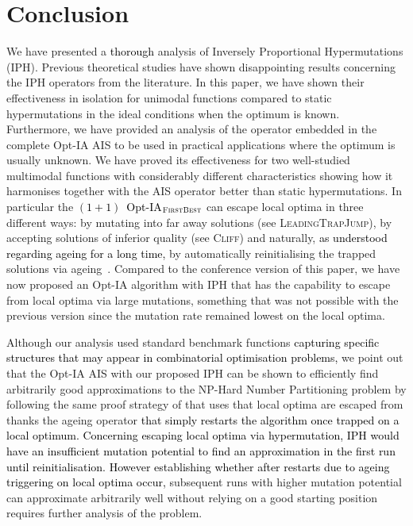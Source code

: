 \documentclass[lettersize,journal]{IEEEtran}
\newcommand{\rev}[1]{\textcolor{black}{#1}}
\newcommand{\rerev}[1]{\textcolor{black}{#1}}
\begin{document}
\section{Conclusion}
We have presented a \rerev{thorough} analysis of Inversely Proportional Hypermutations (IPH).
Previous theoretical studies have shown disappointing results concerning the IPH operators from the literature.
In this paper, we have 
shown their effectiveness in isolation for unimodal functions compared to static hypermutations in the ideal conditions when the optimum is known.
Furthermore, we have provided an analysis of the operator embedded in the complete Opt-IA AIS to be used in practical applications where the optimum is usually unknown.
We have proved its effectiveness for two well-studied multimodal functions with considerably different characteristics showing how it harmonises together with the AIS operator better than static hypermutations.
In particular the \rev{$(1+1)$~Opt-IA$_{\textsc{FirstBest}}$} can escape local optima in three different ways: by mutating into far away solutions (see \textsc{LeadingTrapJump}), by accepting solutions of inferior quality (see \textsc{Cliff}) and naturally, \rerev{as understood regarding ageing for a long time,} by automatically reinitialising the trapped solutions via ageing~\cite{HorobaJansenZarges09,JansenZarges2011differentageing,JansenZarges2010restart,OlivetoSudholt2014ageing}.
Compared to the conference version of this paper, we have now proposed an Opt-IA algorithm with IPH that has the capability to escape from local optima via large mutations, something that was not possible with the previous version since the mutation rate remained lowest on the local optima.


Although our analysis used standard benchmark functions \rev{capturing specific structures that may appear in combinatorial optimisation problems,}
 we point out that the Opt-IA AIS with our proposed IPH can be shown to efficiently find arbitrarily good approximations to the NP-Hard Number Partitioning problem by following the same proof strategy of \cite{CorusOlivetoYazdaniAIJ2019} that uses that local optima are escaped from thanks the ageing operator \rev{that simply restarts the algorithm once trapped on a local optimum.}  \textcolor{black}{Concerning escaping local optima via hypermutation, IPH would have an insufficient mutation potential to find an approximation in the first run until reinitialisation. However \rev{establishing} whether after restarts due to ageing triggering on local optima occur,} subsequent runs  with higher mutation potential can approximate arbitrarily well without relying on a good starting position requires further analysis of the problem. %
\end{document}
